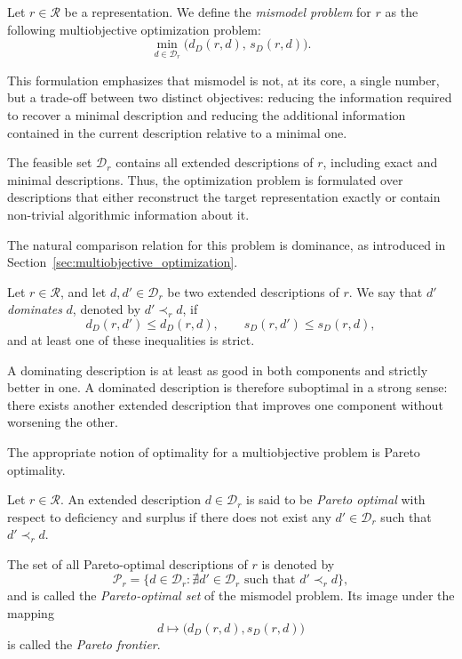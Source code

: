 \begin{definition}
\label{def:mismodel_problem}
Let $r\in\mathcal R$ be a representation. We define the \emph{mismodel problem} for $r$ as the following multiobjective optimization problem:
\[
\min_{d\in\mathcal D_r} \bigl(d_D(r,d),\,s_D(r,d)\bigr).
\]
\end{definition}

This formulation emphasizes that mismodel is not, at its core, a single number, but a trade-off between two distinct objectives: reducing the information required to recover a minimal description and reducing the additional information contained in the current description relative to a minimal one.

The feasible set $\mathcal D_r$ contains all extended descriptions of $r$, including exact and minimal descriptions. Thus, the optimization problem is formulated over descriptions that either reconstruct the target representation exactly or contain non-trivial algorithmic information about it.

The natural comparison relation for this problem is dominance, as introduced in Section~\ref{sec:multiobjective_optimization}.

\begin{definition}
\label{def:dominance_mismodel}
Let $r\in\mathcal R$, and let $d,d'\in\mathcal D_r$ be two extended descriptions of $r$. We say that $d'$
\emph{dominates} $d$, denoted by $d' \prec_r d$, if
\[
d_D(r,d')\le d_D(r,d), \qquad s_D(r,d')\le s_D(r,d),
\]
and at least one of these inequalities is strict.
\end{definition}

A dominating description is at least as good in both components and strictly better in one. A dominated description is therefore suboptimal in a strong sense: there exists another extended description that improves one component without worsening the other.

The appropriate notion of optimality for a multiobjective problem is Pareto optimality.

\begin{definition}
\label{def:pareto_mismodel}
Let $r\in\mathcal R$. An extended description $d\in\mathcal D_r$ is said to be \emph{Pareto optimal} with respect to deficiency and surplus if there does not exist any $d'\in\mathcal D_r$ such that $d'\prec_r d$.

The set of all Pareto-optimal descriptions of $r$ is denoted by
\[
\mathcal P_r = \bigl\{ d\in\mathcal D_r: \nexists d'\in\mathcal D_r \text{ such that }d'\prec_r d \bigr\},
\]
and is called the \emph{Pareto-optimal set} of the mismodel problem. Its image under the mapping
\[
d\mapsto \bigl(d_D(r,d),s_D(r,d)\bigr)
\]
is called the \emph{Pareto frontier}.
\end{definition}

